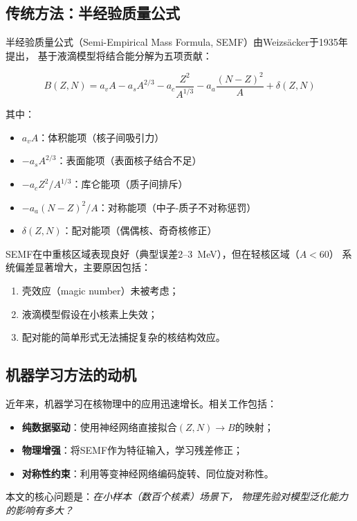 \documentclass[12pt, a4paper]{article}
\begin{document}
\subsection{传统方法：半经验质量公式}

半经验质量公式（Semi-Empirical Mass Formula, SEMF）由Weizsäcker于1935年提出\cite{weizsacker1935}，
基于液滴模型将结合能分解为五项贡献：

\begin{equation}
  B(Z, N) = a_v A - a_s A^{2/3} - a_c \frac{Z^2}{A^{1/3}}
            - a_a \frac{(N-Z)^2}{A} + \delta(Z, N)
\end{equation}

其中：
\begin{itemize}
  \item $a_v A$：体积能项（核子间吸引力）
  \item $-a_s A^{2/3}$：表面能项（表面核子结合不足）
  \item $-a_c Z^2/A^{1/3}$：库仑能项（质子间排斥）
  \item $-a_a (N-Z)^2/A$：对称能项（中子-质子不对称惩罚）
  \item $\delta(Z, N)$：配对能项（偶偶核、奇奇核修正）
\end{itemize}

SEMF在中重核区域表现良好（典型误差2--3~MeV），但在轻核区域（$A < 60$）
系统偏差显著增大，主要原因包括：
\begin{enumerate}
  \item 壳效应（magic number）未被考虑；
  \item 液滴模型假设在小核素上失效；
  \item 配对能的简单形式无法捕捉复杂的核结构效应。
\end{enumerate}

\subsection{机器学习方法的动机}

近年来，机器学习在核物理中的应用迅速增长。相关工作包括：
\begin{itemize}
  \item \textbf{纯数据驱动}：使用神经网络直接拟合$(Z, N) \to B$的映射；
  \item \textbf{物理增强}：将SEMF作为特征输入，学习残差修正；
  \item \textbf{对称性约束}：利用等变神经网络编码旋转、同位旋对称性。
\end{itemize}

本文的核心问题是：\emph{在小样本（数百个核素）场景下，
物理先验对模型泛化能力的影响有多大？}
\end{document}
